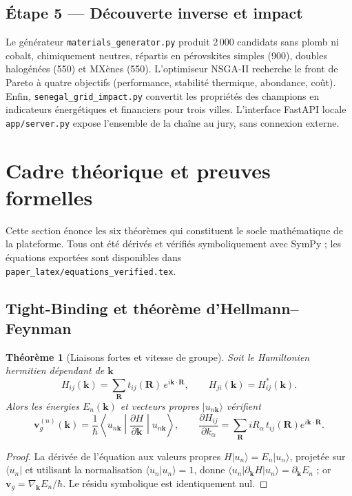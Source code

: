\documentclass[11pt,a4paper,french]{article}
\newtheorem{theoreme}{Théorème}
\begin{document}
\subsection{Étape 5 — Découverte inverse et impact}

Le générateur \texttt{materials\_generator.py} produit 2\,000 candidats sans plomb ni cobalt, chimiquement neutres, répartis en pérovskites simples (900), doubles halogénées (550) et MXènes (550). L'optimiseur NSGA-II \cite{deb2002} recherche le front de Pareto à quatre objectifs (performance, stabilité thermique, abondance, coût). Enfin, \texttt{senegal\_grid\_impact.py} convertit les propriétés des champions en indicateurs énergétiques et financiers pour trois villes. L'interface FastAPI locale \texttt{app/server.py} expose l'ensemble de la chaîne au jury, sans connexion externe.

\section{Cadre théorique et preuves formelles}
\label{sec:theorie}

Cette section énonce les six théorèmes qui constituent le socle mathématique de la plateforme. Tous ont été dérivés et vérifiés symboliquement avec SymPy ; les équations exportées sont disponibles dans \texttt{paper\_latex/equations\_verified.tex}.

\subsection{Tight-Binding et théorème d'Hellmann--Feynman}

\begin{theoreme}[Liaisons fortes et vitesse de groupe]
Soit le Hamiltonien hermitien dépendant de $\mathbf{k}$
\begin{equation}
  H_{ij}(\mathbf{k}) = \sum_{\mathbf{R}} t_{ij}(\mathbf{R})\,e^{i\mathbf{k}\cdot\mathbf{R}},
  \qquad H_{ji}(\mathbf{k}) = H_{ij}^{*}(\mathbf{k}).
  \label{eq:tb}
\end{equation}
Alors les énergies $E_n(\mathbf{k})$ et vecteurs propres $|u_{n\mathbf{k}}\rangle$ vérifient
\begin{equation}
  \mathbf{v}_g^{(n)}(\mathbf{k}) = \frac{1}{\hbar}
  \left\langle u_{n\mathbf{k}}\middle|
  \frac{\partial H}{\partial\mathbf{k}}
  \middle|u_{n\mathbf{k}}\right\rangle,
  \qquad
  \frac{\partial H_{ij}}{\partial k_\alpha}
  = \sum_{\mathbf{R}} i R_\alpha\, t_{ij}(\mathbf{R}) e^{i\mathbf{k}\cdot\mathbf{R}}.
  \label{eq:hf}
\end{equation}
\end{theoreme}
\begin{proof}
La dérivée de l'équation aux valeurs propres $H|u_n\rangle=E_n|u_n\rangle$, projetée sur $\langle u_n|$ et utilisant la normalisation $\langle u_n|u_n\rangle=1$, donne $\langle u_n|\partial_{\mathbf{k}}H|u_n\rangle=\partial_{\mathbf{k}}E_n$ ; or $\mathbf{v}_g=\nabla_{\mathbf{k}}E_n/\hbar$. Le résidu symbolique est identiquement nul.
\end{proof}
\end{document}
